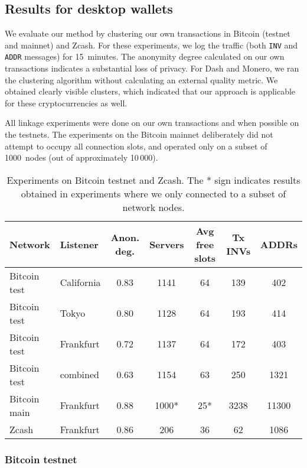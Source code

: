 \subsection{Results for desktop wallets}

We evaluate our method by clustering our own transactions in Bitcoin (testnet and mainnet) and Zcash.
For these experiments, we log the traffic (both \texttt{INV} and \texttt{ADDR} messages) for 15~minutes.
The anonymity degree calculated on our own transactions indicates a substantial loss of privacy.
For Dash and Monero, we ran the clustering algorithm without calculating an external quality metric.
We obtained clearly visible clusters, which indicated that our approach is applicable for these cryptocurrencies as well.

All linkage experiments were done on our own transactions and when possible on the testnets.
The experiments on the Bitcoin mainnet deliberately did not attempt to occupy all connection slots, and operated only on a subset of 1000~nodes (out of approximately 10\,000).

\begin{table*}[!t]
	\normalsize
	\caption{Experiments on Bitcoin testnet and Zcash. The * sign indicates results obtained in experiments where we only connected to a subset of network nodes.}
	\centering
	\begin{tabular}{ | l | l | c | c | c | c | c | }
		\hline
		Network & Listener & Anon. deg. & Servers & Avg free slots & Tx INVs & ADDRs \\
		\hline
		Bitcoin test & California & 0.83 & 1141 & 64 & 139 & 402 \\
		Bitcoin test & Tokyo & 0.80 & 1128 & 64 & 193 & 414 \\
		Bitcoin test & Frankfurt & 0.72 & 1137 & 64 & 172 & 403 \\
		Bitcoin test & combined & 0.63 & 1154 & 63 & 250 & 1321 \\
		Bitcoin main & Frankfurt & 0.88 & 1000* & 25* & 3238 & 11300 \\
		Zcash & Frankfurt & 0.86 & 206 & 36 & 62 & 1086 \\
		\hline
	\end{tabular}
	\label{tab:results}
\end{table*}

\subsubsection{Bitcoin testnet}

